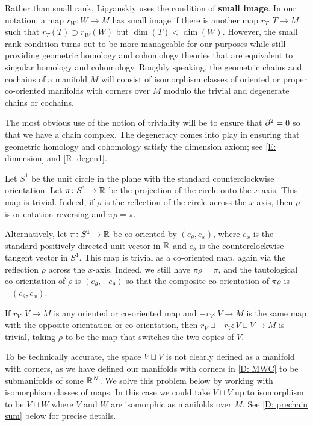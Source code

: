 Rather than small rank, Lipyanskiy uses the condition of \textbf{small image}.
In our notation, a map $r_W \colon W \to M$ has small image if there is another map $r_T \colon T \to M$ such that $r_T(T)\supset r_W(W)$ but $\dim(T)<\dim(W)$.
However, the small rank condition turns out to be more manageable for our purposes while still providing geometric homology and cohomology theories that are equivalent to singular homology and cohomology.
Roughly speaking, the geometric chains and cochains of a manifold $M$ will consist of isomorphism classes of oriented or proper co-oriented manifolds with corners over $M$ modulo the trivial and degenerate chains or cochains.

The most obvious use of the notion of triviality will be to ensure that $\partial^2 = 0$ so that we have a chain complex.
The degeneracy comes into play in ensuring that geometric homology and cohomology satisfy the dimension axiom; see \cref{E: dimension} and \cref{R: degen1}.

\begin{example}
	Let $S^1$ be the unit circle in the plane with the standard counterclockwise orientation.
	Let $\pi \colon S^1 \to \mathbb{R}$ be the projection of the circle onto the $x$-axis.
	This map is trivial.
	Indeed, if $\rho$ is the reflection of the circle across the $x$-axis, then $\rho$ is orientation-reversing and $\pi \rho = \pi$.

	Alternatively, let $\pi \colon S^1 \to \mathbb{R}$ be co-oriented by $(e_\theta,e_x)$, where $e_x$ is the standard positively-directed unit vector in $\mathbb{R}$ and $e_\theta$ is the counterclockwise tangent vector in $S^1$.
	This map is trivial as a co-oriented map, again via the reflection $\rho$ across the $x$-axis.
	Indeed, we still have $\pi \rho = \pi$, and the tautological co-orientation of $\rho$ is $(e_\theta,-e_\theta)$ so that the composite co-orientation of $\pi\rho$ is $-(e_\theta,e_x)$.
\end{example}

\begin{example}
	If $r_V \colon V \to M$ is any oriented or co-oriented map and $-r_V \colon V \to M$ is the same map with the opposite orientation or co-orientation, then $r_V \sqcup -r_V \colon V \sqcup V \to M$ is trivial, taking $\rho$ to be the map that switches the two copies of $V$.

	To be technically accurate, the space $V \sqcup V$ is not clearly defined as a manifold with corners, as we have defined our manifolds with corners in \cref{D: MWC} to be submanifolds of some $\mathbb{R}^N$. We solve this problem below by working with isomorphism classes of maps.
	In this case we could take $V \sqcup V$ up to isomorphism to be $V \sqcup W$ where $V$ and $W$ are isomorphic as manifolds over $M$.
	See \cref{D: prechain sum} below for precise details.
\end{example}

